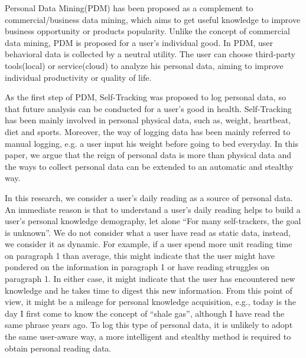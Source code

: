 \documentclass{sigchi}
\begin{document}
Personal Data Mining\cite{ozzie2011personal}(PDM) has been proposed as a complement to commercial/business data mining, which aims to get useful knowledge to improve business opportunity or products popularity. Unlike the concept of commercial data mining, PDM is proposed for a user’s individual good. In PDM, user behavioral data is collected by a neutral utility. The user can choose third-party tools(local) or service(cloud) to analyze his personal data, aiming to improve individual productivity or quality of life.

 
	As the first step of PDM, Self-Tracking\cite{swan2009emerging} was proposed to log personal data, so that future analysis can be conducted for a user’s good in health. Self-Tracking has been mainly involved in personal physical data, such as, weight, heartbeat, diet and sports. Moreover, the way of logging data has been mainly referred to manual logging, e.g. a user input his weight before going to bed everyday. In this paper, we argue that the reign of personal data is more than physical data and the ways to collect personal data can be extended to an automatic and stealthy way. 


In this research, we consider a user’s daily reading as a source of personal data. An immediate reason is that to understand a user’s daily reading helps to build a user’s personal knowledge demography, let alone “For many self-trackers, the goal is unknown”\cite{wolf2010data}. We do not consider what a user have read as static data, instead, we consider it as dynamic. For example, if a user spend more unit reading time on  paragraph 1 than average, this might indicate that the user might have pondered on the information in paragraph 1 or have reading struggles on paragraph 1. In either case, it might indicate that the user has encountered new knowledge and he takes time to digest this new information. From this point of view, it might be a mileage for personal knowledge acquisition, e.g., today is the day I first come to know the concept of “shale gas”, although I have read the same phrase years ago. To log this type of personal data, it is unlikely to adopt the same user-aware way, a more intelligent and stealthy method is required to obtain personal reading data. 
\end{document}
